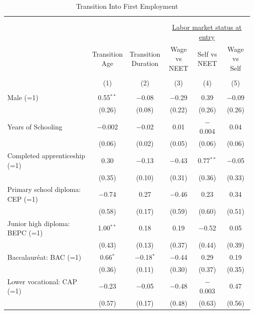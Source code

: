 \documentclass[
  11pt,
a4paper
]{article}
\begin{document}
\begin{table}[H] \centering 
  \caption{Transition Into First Employment} 
  \label{tab:tbl-firstempreg} 
\scriptsize 
\begin{tabular}{@{\extracolsep{3pt}}lccccc} 
\\[-1.8ex]\hline 
\hline \\[-1.8ex] 
\\[-1.8ex] & \multicolumn{2}{c}{} & \multicolumn{3}{c}{\underline{Labor market status at entry}} \\ 
 & \shortstack{Transition  \\ Age} & \shortstack{Transition \\ Duration} & \shortstack{Wage vs \\ NEET} & \shortstack{Self vs \\ NEET} & \shortstack{Wage vs \\ Self} \\ 
\\[-1.8ex] & (1) & (2) & (3) & (4) & (5)\\ 
\hline \\[-1.8ex] 
 Male (=1) & 0.55$^{**}$ & $-$0.08 & $-$0.29 & 0.39 & $-$0.09 \\ 
  & (0.26) & (0.08) & (0.22) & (0.26) & (0.26) \\ 
  Years of Schooling & $-$0.002 & $-$0.02 & 0.01 & $-$0.004 & 0.04 \\ 
  & (0.06) & (0.02) & (0.05) & (0.06) & (0.06) \\ 
  Completed apprenticeship (=1) & 0.30 & $-$0.13 & $-$0.43 & 0.77$^{**}$ & $-$0.05 \\ 
  & (0.35) & (0.10) & (0.31) & (0.36) & (0.33) \\ 
  Primary school diploma: CEP (=1) & $-$0.74 & 0.27 & $-$0.46 & 0.23 & 0.34 \\ 
  & (0.58) & (0.17) & (0.59) & (0.60) & (0.51) \\ 
  Junior high diploma: BEPC (=1) & 1.00$^{**}$ & 0.18 & 0.19 & $-$0.52 & 0.05 \\ 
  & (0.43) & (0.13) & (0.37) & (0.44) & (0.39) \\ 
  Baccalauréat: BAC (=1) & 0.66$^{*}$ & $-$0.18$^{*}$ & $-$0.44 & 0.29 & 0.19 \\ 
  & (0.36) & (0.11) & (0.30) & (0.37) & (0.35) \\ 
  Lower vocational: CAP (=1) & $-$0.23 & $-$0.05 & $-$0.48 & $-$0.003 & 0.47 \\ 
  & (0.57) & (0.17) & (0.48) & (0.63) & (0.56) \\ 

\end{tabular}
\end{table}
\end{document}
